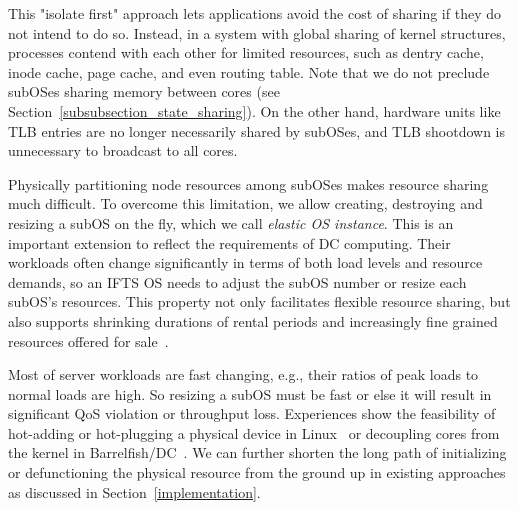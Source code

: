 \documentclass[pageno]{jpaper}
\begin{document}
This "isolate first" approach lets
applications avoid the cost of sharing if they do not intend to do so.
Instead, in a system with global sharing of kernel structures, processes contend with each other for limited resources, such as dentry cache, inode cache, page cache, and even routing table. Note that we do not preclude subOSes sharing memory between cores (see Section~\ref{subsubsection_state_sharing}).
 On the other hand, hardware units like TLB entries are no longer necessarily shared by subOSes, and TLB shootdown is unnecessary to broadcast to all cores.


















































Physically partitioning node  resources among subOSes makes resource sharing much difficult.  To overcome this limitation, we allow creating, destroying and resizing a subOS on the fly, which we call \emph{elastic OS instance}. This is an important extension to reflect the requirements of DC computing. Their workloads often  change significantly in terms of both load levels and resource demands, so an IFTS OS needs to adjust the subOS number or resize each subOS's resources.
This property not only facilitates flexible resource sharing, but also supports shrinking durations of rental periods and increasingly fine grained resources offered for sale~\cite{agmon2012resource}. 

Most of server workloads are fast changing, e.g., their ratios of peak loads to normal loads are high. So resizing a subOS must be fast or else it will  result in significant QoS violation or throughput loss.
Experiences show the feasibility of hot-adding or hot-plugging a physical device in Linux~\cite{mwaikambo2004linuxCPUhotplug, schopp2006memoryhotplug, kroah2001deivcehotplug} or decoupling cores from the kernel in Barrelfish/DC~\cite{Zellweger:2014:DecouplingCores}.
We can further shorten the long path of initializing or defunctioning the physical resource from the ground up in existing approaches as discussed in Section~\ref{implementation}.
\end{document}
